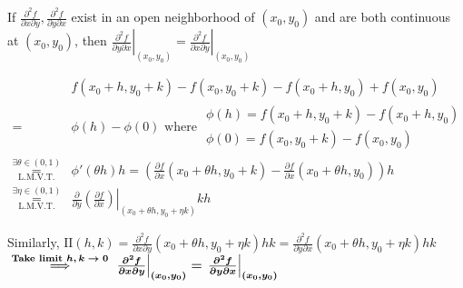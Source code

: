 \begin{theorem}
    If $\frac{\partial^2f}{\partial x\partial y},\frac{\partial^2f}{\partial y\partial x}$ exist in an open neighborhood of $(x_0,y_0)$ and are both continuous at $\left(x_0,y_0\right)$, then $\left.\frac{\partial^2f}{\partial y\partial x}\right|_{\left(x_0,y_0\right)}=\left.\frac{\partial^2f}{\partial x\partial y}\right|_{\left(x_0,y_0\right)}$
    \begin{pf}
        \begin{align*}
                                                                           & f(x_0+h,y_0+k)-f(x_0,y_0+k)-f(x_0+h,y_0)+f(x_0,y_0)                                                                              \\
            =                                                              & \phi(h)-\phi(0)\text{ where }\substack{\phi(h)=f(x_0+h,y_0+k)-f(x_0+h,y_0)                                                       \\\phi(0)=f(x_0,y_0+k)-f(x_0,y_0)}\\
            \overset{\exists\theta\in(0,1)}{\underset{\text{L.M.V.T.}}{=}} & \phi'(\theta h)h=\left(\frac{\partial f}{\partial x}(x_0+\theta h,y_0+k)-\frac{\partial f}{\partial x}(x_0+\theta h,y_0)\right)h \\
            \overset{\exists\eta\in(0,1)}{\underset{\text{L.M.V.T.}}{=}}   & \left.\frac{\partial}{\partial y}\left(\frac{\partial f}{\partial x}\right)\right|_{(x_0+\theta h,y_0+\eta k)}kh
        \end{align*}

        Similarly, $\mathrm{II}(h,k)=\frac{\partial^2 f}{\partial x\partial y}(x_0+\theta h,y_0+\eta k)hk=\frac{\partial^2 f}{\partial y\partial x}(x_0+\theta h,y_0+\eta k)hk$\\
        $\overset{\text{ \textbf{\boldmath Take limit $h,k\to 0$} }}{\implies}\boldsymbol{\left.\frac{\partial^2 f}{\partial x\partial y}\right|_{(x_0,y_0)}=\left.\frac{\partial^2 f}{\partial y\partial x}\right|_{(x_0,y_0)}}$
    \end{pf}
\end{theorem}

